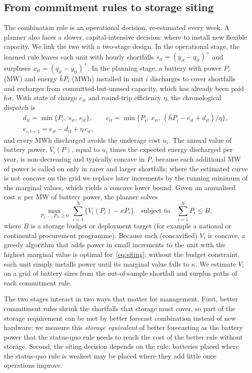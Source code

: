 \subsection{From commitment rules to storage siting}\label{sec:siting}

The combination rule is an operational decision, re-estimated every week.
A planner also faces a slower, capital-intensive decision: where to install new flexible capacity.
We link the two with a two-stage design.
In the operational stage, the learned rule leaves each unit with hourly shortfalls $s_{it}=(y_{it}-q_{it})^+$ and surpluses $x_{it}=(q_{it}-y_{it})^+$.
In the planning stage, a battery with power $P_i$ (MW) and energy $\bar h P_i$ (MWh) installed in unit $i$ discharges to cover shortfalls and recharges from committed-but-unused capacity, which has already been paid for.
With state of charge $e_{it}$ and round-trip efficiency $\eta$, the chronological dispatch is
\begin{gather*}
d_{it}=\min\{P_i,\,s_{it},\,e_{it}\},\qquad c_{it}=\min\{P_i,\,x_{it},\,(\bar hP_i-e_{it}+d_{it})/\eta\},\\
e_{i,t+1}=e_{it}-d_{it}+\eta\, c_{it},
\end{gather*}
and every MWh discharged avoids the underage cost $u_i$.
The annual value of battery power, $V_i(P)$, equal to $u_i$ times the expected energy discharged per year, is non-decreasing and typically concave in $P$, because each additional MW of power is called on only in rarer and larger shortfalls; where the estimated curve is not concave on the grid we replace later increments by the running minimum of the marginal values, which yields a concave lower bound.
Given an annualised cost $\kappa$ per MW of battery power, the planner solves
\begin{equation}\label{eq:siting}
\max_{P_1,\dots,P_N\ge0}\ \sum_{i=1}^N\big\{V_i(P_i)-\kappa P_i\big\}\quad\text{subject to}\quad\sum_{i=1}^N P_i\le B,
\end{equation}
where $B$ is a storage budget or deployment target (for example a national or continental procurement programme).
Because each (concavified) $V_i$ is concave, a greedy algorithm that adds power in small increments to the unit with the highest marginal value is optimal for~\eqref{eq:siting}; without the budget constraint, each unit simply installs power until its marginal value falls to $\kappa$.
We estimate $V_i$ on a grid of battery sizes from the out-of-sample shortfall and surplus paths of each commitment rule.

The two stages interact in two ways that matter for management.
First, better commitment rules shrink the shortfalls that storage must cover, so part of the storage requirement can be met by better forecast combination instead of new hardware; we measure this \emph{storage equivalent} of better forecasting as the battery power that the status-quo rule needs to reach the cost of the better rule without storage.
Second, the siting decision depends on the rule: batteries placed where the status-quo rule is weakest may be placed where they add little once operations improve.

